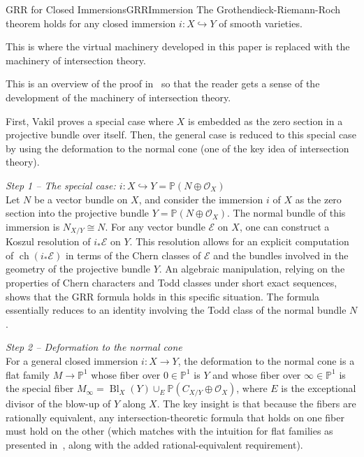 \documentclass{ut-thesis}
\newenvironment{Proof}[1][]
  {\begin{ProofTcb}[#1]}
  {\end{ProofTcb}}
\renewcommand{\P}{{\mathbb{P}}}
\newcommand{\CO}{{\mathcal{O}}}
\newcommand{\ch}{{\operatorname{ch}}}
\renewcommand{\ch}{{\operatorname{ch}}}
\begin{document}
\begin{prop}{GRR for Closed Immersions}{GRRImmersion}
    The Grothendieck-Riemann-Roch theorem holds for any closed immersion $i: X \hookrightarrow Y$ of smooth varieties.
\end{prop}

This is where the virtual machinery developed in this paper is replaced with the machinery of intersection
theory.

\begin{Proof}
    This is an overview of the proof in~\cite{vakilIntersectionTheory} so that the reader gets a sense of the
    development of the machinery of intersection theory.

   First, Vakil proves a special case where $X$ is embedded as the zero section in a projective
   bundle over itself. Then, the general case is reduced to this special case by using the deformation to the
   normal cone (one of the key idea of intersection theory).

  \emph{Step 1 -- The special case: $i: X \hookrightarrow Y = \P(N \oplus \CO_X)$}\\
  Let $N$ be a vector bundle on $X$, and consider the immersion $i$ of $X$ as the zero section into the
  projective bundle $Y = \P(N \oplus \CO_X)$. The normal bundle of this immersion is $N_{X/Y} \cong N$. For any
  vector bundle $\mathcal{E}$ on $X$, one can construct a Koszul resolution of $i_*\mathcal{E}$ on $Y$. This
  resolution allows for an explicit computation of $\ch(i_*\mathcal{E})$ in terms of the Chern classes of
  $\mathcal{E}$ and the bundles involved in the geometry of the projective bundle $Y$. An algebraic
  manipulation, relying on the properties of Chern characters and Todd classes under short exact sequences,
  shows that the GRR formula holds in this specific situation. The formula essentially reduces to an identity
  involving the Todd class of the normal bundle $N$.

  \emph{Step 2 -- Deformation to the normal cone}\\
  For a general closed immersion $i: X \to Y$, the deformation to the normal cone is a flat family $M \to \P^1$
  whose fiber over $0 \in \P^1$ is $Y$ and whose fiber over $\infty \in \P^1$ is the special fiber $M_\infty =
  \operatorname{Bl}_X(Y) \cup_E \P(C_{X/Y} \oplus \CO_X)$, where $E$ is the exceptional divisor of the blow-up
  of $Y$ along $X$. The key insight is that because the fibers are rationally equivalent, any
  intersection-theoretic formula that holds on one fiber must hold on the other (which matches with the
  intuition for flat families as presented in~\cite{hartshorneAlgebraicGeometry2013}, along with the added
  rational-equivalent requirement).


\end{Proof}
\end{document}
